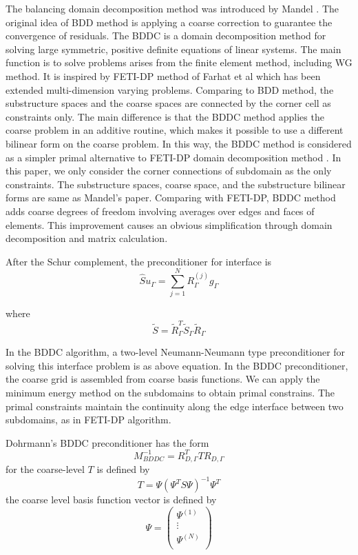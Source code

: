 The balancing domain decomposition method was introduced by Mandel \cite{mandel2005algebraic}. The original idea of BDD method is applying a coarse correction to guarantee the convergence of residuals. The BDDC is a domain decomposition method for solving large symmetric, positive definite equations of linear systems. The main function is to solve problems arises from the finite element method, including WG method. It is inspired by FETI-DP method of Farhat et al \cite{farhat1994optimal, farhat2001feti} which has been extended multi-dimension varying problems. Comparing to BDD method, the substructure spaces and the coarse spaces are connected by the corner cell as constraints only. The main difference is that the BDDC method applies the coarse problem in an additive routine, which makes it possible to use a different bilinear form on the coarse problem. In this way, the BDDC method is considered as a simpler primal alternative to FETI-DP domain decomposition method \cite{li2006feti}. In this paper, we only consider the corner connections of subdomain as the only constraints. The substructure spaces, coarse space, and the substructure bilinear forms are same as Mandel’s paper. Comparing with FETI-DP, BDDC method adds coarse degrees of freedom involving averages over edges and faces of elements. This improvement causes an obvious simplification through domain decomposition and matrix calculation.

After the Schur complement, the preconditioner for interface is 
\begin{equation}
\hat{S}u_{\Gamma} = \sum_{j = 1}^{N} R_{\Gamma}^{(j)} g_{\Gamma}
\end{equation}

where
\begin{equation}
\tilde{S} = \tilde{R}_{\Gamma}^{T} \tilde{S}_{\Gamma} \tilde{R}_{\Gamma}
\end{equation}

In the BDDC algorithm, a two-level Neumann-Neumann type preconditioner for solving this interface problem is as above equation. In the BDDC preconditioner, the coarse grid is assembled from coarse basis functions. We can apply the minimum energy method on the subdomains to obtain primal constrains. The primal constraints maintain the continuity along the edge interface between two subdomains, as in FETI-DP algorithm. 

Dohrmann's BDDC preconditioner \cite{dohrmann2003preconditioner, dohrmann2003study, mandel2005algebraic} has the form
\begin{equation}
M_{BDDC}^{-1} = R_{D, \Gamma}^{T} T R_{D, \Gamma}
\end{equation}
for the coarse-level $ T $ is defined by 
\begin{equation}
T = \Psi (\Psi^{T} S \Psi)^{-1} \Psi^{T}
\end{equation}
the coarse level basis function vector is defined by 
\begin{equation}
\Psi = \begin{pmatrix}
\Psi^{(1)} \\ \vdots \\ \Psi^{(N)}\\
\end{pmatrix}
\end{equation}

